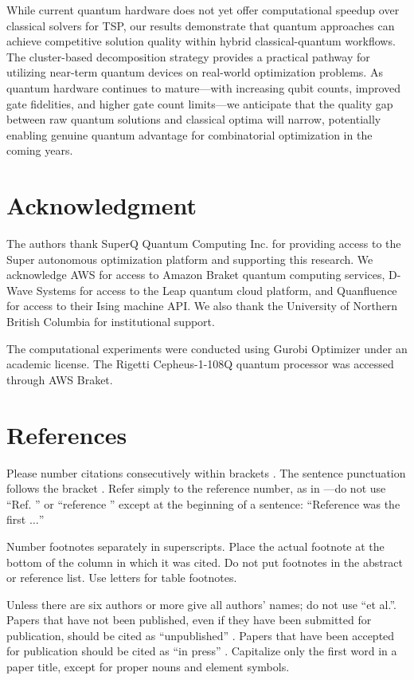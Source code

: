 \documentclass[conference]{IEEEtran}
\begin{document}
While current quantum hardware does not yet offer computational speedup over classical solvers for TSP, our results demonstrate that quantum approaches can achieve competitive solution quality within hybrid classical-quantum workflows. The cluster-based decomposition strategy provides a practical pathway for utilizing near-term quantum devices on real-world optimization problems. As quantum hardware continues to mature---with increasing qubit counts, improved gate fidelities, and higher gate count limits---we anticipate that the quality gap between raw quantum solutions and classical optima will narrow, potentially enabling genuine quantum advantage for combinatorial optimization in the coming years.

\section*{Acknowledgment}

The authors thank SuperQ Quantum Computing Inc. for providing access to the Super autonomous optimization platform and supporting this research. We acknowledge AWS for access to Amazon Braket quantum computing services, D-Wave Systems for access to the Leap quantum cloud platform, and Quanfluence for access to their Ising machine API. We also thank the University of Northern British Columbia for institutional support.

The computational experiments were conducted using Gurobi Optimizer under an academic license. The Rigetti Cepheus-1-108Q quantum processor was accessed through AWS Braket.

\section*{References}

Please number citations consecutively within brackets \cite{b1}. The 
sentence punctuation follows the bracket \cite{b2}. Refer simply to the reference 
number, as in \cite{b3}---do not use ``Ref. \cite{b3}'' or ``reference \cite{b3}'' except at 
the beginning of a sentence: ``Reference \cite{b3} was the first $\ldots$''

Number footnotes separately in superscripts. Place the actual footnote at 
the bottom of the column in which it was cited. Do not put footnotes in the 
abstract or reference list. Use letters for table footnotes.

Unless there are six authors or more give all authors' names; do not use 
``et al.''. Papers that have not been published, even if they have been 
submitted for publication, should be cited as ``unpublished'' \cite{b4}. Papers 
that have been accepted for publication should be cited as ``in press'' \cite{b5}. 
Capitalize only the first word in a paper title, except for proper nouns and 
element symbols.
\end{document}
